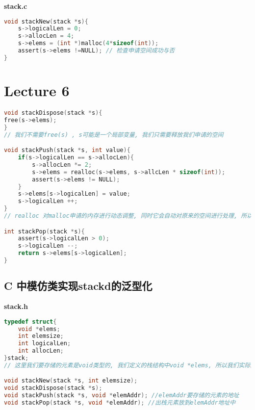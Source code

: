 \documentclass{article}
\begin{document}
\textbf{stack.c}
\begin{lstlisting}[language = C]
void stackNew(stack *s){
	s->logicalLen = 0;
	s->allocLen = 4;
	s->elems = (int *)malloc(4*sizeof(int));
	assert(s->elems !=NULL); // 检查申请空间成功与否
}
\end{lstlisting}

\section{Lecture 6}
\begin{lstlisting}[language = C]
void stackDispose(stack *s){
free(s->elems);
}
// 我们不需要free(s) , s可能是一个局部变量, 我们只需要释放我们申请的空间

void stackPush(stack *s, int value){
	if(s->logicalLen == s->allocLen){
		s->allocLen *= 2;
		s->elems = realloc(s->elems, s->allcLen * sizeof(int));
		assert(s->elems != NULL);
	}
	s->elems[s->logicalLen] = value;
	s->logicalLen ++;
}
// realloc 对malloc申请的内存进行动态调整, 同时它会自动对原来的空间进行处理, 所以不需要我们手动处理

int stackPop(stack *s){
	assert(s->logicalLen > 0);
	s->logicalLen --;
	return s->elems[s->logicalLen];
}
\end{lstlisting}

\subsection{C 中模仿类实现stackd的泛型化}
\textbf{stack.h}
\begin{lstlisting}[language = C]
typedef struct{
	void *elems;
	int elemsize;
	int logicalLen;
	int allocLen;
}stack;
// 这里我们要存储的元素是void类型的, 我们定义的栈结构中void *elems, 所以我们实际上在栈中存储的是我们想要存储东西的指针, 在这里, 也就是说栈中的元素是void *类型的

void stackNew(stack *s, int elemsize);
void stackDispose(stack *s);
void stackPush(stack *s, void *elemAddr); //elemAddr要存储的元素的地址
void stackPop(stack *s, void *elemAddr); //出栈元素放到elemAddr地址中
\end{lstlisting}
\end{document}
